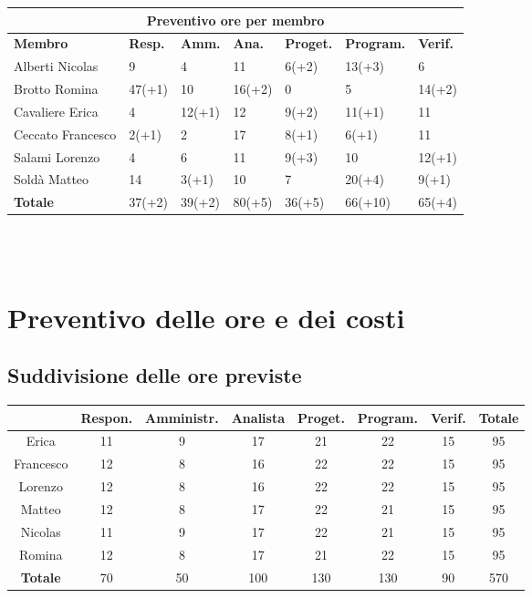 \documentclass[a4paper, 12pt]{article}
\begin{document}
\begin{center}
	\begin{tabularx}{\textwidth}{|X|X|X|X|X|X|X|}
		\hline
		\multicolumn{7}{|c|}{\textbf{Preventivo ore per membro}}                                      \\
		\hline
		\hline
		\textbf{Membro}  & \textbf{Resp.} & \textbf{Amm.} & \textbf{Ana.} &
		\textbf{Proget.} & \textbf{Program.} & \textbf{Verif.} \\
		\hline
		Alberti Nicolas    	&9 	&4	&11	&6(+2)	&13(+3) &6	\\
		\hline
		Brotto Romina    	&47(+1) &10	&16(+2)	&0	&5 &14(+2)	\\
		\hline
		Cavaliere Erica    	&4 	&12(+1)  &12  &9(+2) &11(+1) &11	\\
		\hline
		Ceccato Francesco   &2(+1) 	&2  &17 &8(+1) &6(+1) &11	\\
		\hline
		Salami Lorenzo    	&4 	&6  &11 &9(+3) &10 &12(+1)	\\
		\hline
		Soldà Matteo    	&14	&3(+1)  &10 &7 &20(+4) &9(+1)	\\
		\hline
		\hline
		\textbf{Totale} 	&37(+2) &39(+2) &80(+5) &36(+5) &66(+10) &65(+4)	\\
		\hline
	\end{tabularx}\\[8pt]
	\mbox{}\\
\end{center}



\newpage

\section{Preventivo delle ore e dei costi}

\subsection{Suddivisione delle ore previste}

\begin{tabular}{|c|c|c|c|c|c|c|c|}
    \hline
    \textbf{} & \textbf{Respon.} & \textbf{Amministr.} & \textbf{Analista} & \textbf{Proget.} & \textbf{Program.} & \textbf{Verif.} & \textbf{Totale}\\
    \hline
    Erica & 11 & 9 & 17 & 21 & 22 & 15 & 95\\
    \hline
    Francesco & 12 & 8 & 16 & 22 & 22 & 15 & 95\\
    \hline
    Lorenzo & 12 & 8 & 16 & 22 & 22 & 15 & 95\\
    \hline
    Matteo & 12 & 8 & 17 & 22 & 21 & 15 & 95\\
    \hline
    Nicolas & 11 & 9 & 17 & 22 & 21 & 15 & 95\\
    \hline
    Romina & 12 & 8 & 17 & 21 & 22 & 15 & 95\\
    \hline
    \textbf{Totale} & 70 & 50 & 100 & 130 & 130 & 90 & 570\\
    \hline
\end{tabular}\\[8pt]
\end{document}
